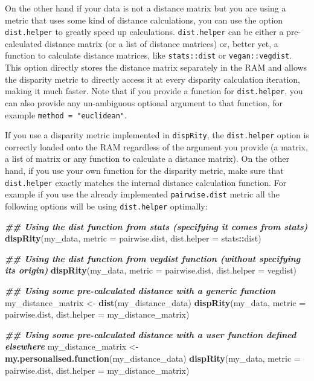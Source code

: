 \documentclass[
]{book}
\newenvironment{Shaded}{\begin{snugshade}}{\end{snugshade}}
\newcommand{\AttributeTok}[1]{\textcolor[rgb]{0.13,0.29,0.53}{#1}}
\newcommand{\DocumentationTok}[1]{\textcolor[rgb]{0.56,0.35,0.01}{\textbf{\textit{#1}}}}
\newcommand{\FunctionTok}[1]{\textcolor[rgb]{0.13,0.29,0.53}{\textbf{#1}}}
\newcommand{\NormalTok}[1]{#1}
\newcommand{\OtherTok}[1]{\textcolor[rgb]{0.56,0.35,0.01}{#1}}
\newcommand{\SpecialCharTok}[1]{\textcolor[rgb]{0.81,0.36,0.00}{\textbf{#1}}}
\begin{document}
On the other hand if your data is not a distance matrix but you are using a metric that uses some kind of distance calculations, you can use the option \texttt{dist.helper} to greatly speed up calculations.
\texttt{dist.helper} can be either a pre-calculated distance matrix (or a list of distance matrices) or, better yet, a function to calculate distance matrices, like \texttt{stats::dist} or \texttt{vegan::vegdist}.
This option directly stores the distance matrix separately in the RAM and allows the disparity metric to directly access it at every disparity calculation iteration, making it much faster.
Note that if you provide a function for \texttt{dist.helper}, you can also provide any un-ambiguous optional argument to that function, for example \texttt{method\ =\ "euclidean"}.

If you use a disparity metric implemented in \texttt{dispRity}, the \texttt{dist.helper} option is correctly loaded onto the RAM regardless of the argument you provide (a matrix, a list of matrix or any function to calculate a distance matrix).
On the other hand, if you use your own function for the disparity metric, make sure that \texttt{dist.helper} exactly matches the internal distance calculation function.
For example if you use the already implemented \texttt{pairwise.dist} metric all the following options will be using \texttt{dist.helper} optimally:

\begin{Shaded}
\begin{Highlighting}[]
\DocumentationTok{\#\# Using the dist function from stats (specifying it comes from stats)}
\FunctionTok{dispRity}\NormalTok{(my\_data, }\AttributeTok{metric =}\NormalTok{ pairwise.dist, }\AttributeTok{dist.helper =}\NormalTok{ stats}\SpecialCharTok{::}\NormalTok{dist)}

\DocumentationTok{\#\# Using the dist function from vegdist function (without specifying its origin)}
\FunctionTok{dispRity}\NormalTok{(my\_data, }\AttributeTok{metric =}\NormalTok{ pairwise.dist, }\AttributeTok{dist.helper =}\NormalTok{ vegdist)}

\DocumentationTok{\#\# Using some pre{-}calculated distance with a generic function}
\NormalTok{my\_distance\_matrix }\OtherTok{\textless{}{-}} \FunctionTok{dist}\NormalTok{(my\_distance\_data)}
\FunctionTok{dispRity}\NormalTok{(my\_data, }\AttributeTok{metric =}\NormalTok{ pairwise.dist, }\AttributeTok{dist.helper =}\NormalTok{ my\_distance\_matrix)}

\DocumentationTok{\#\# Using some pre{-}calculated distance with a user function defined elsewhere}
\NormalTok{my\_distance\_matrix }\OtherTok{\textless{}{-}} \FunctionTok{my.personalised.function}\NormalTok{(my\_distance\_data)}
\FunctionTok{dispRity}\NormalTok{(my\_data, }\AttributeTok{metric =}\NormalTok{ pairwise.dist, }\AttributeTok{dist.helper =}\NormalTok{ my\_distance\_matrix)}
\end{Highlighting}
\end{Shaded}
\end{document}
